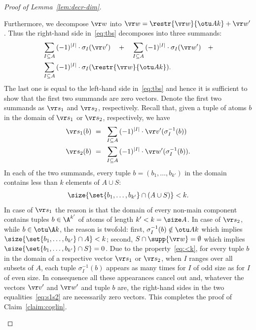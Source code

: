 \begin{proof}[Proof of Lemma~\ref{lem:decr-dim}]
\begin{claimproof}
Furthermore, we decompose $\vr w$ into $\vr w = \restr{\vr w} {\otu A k} + \vr w'$.
Thus the right-hand side in~\eqref{eq:tbs}  decomposes into three summands:
\begin{align*}
&\sum_{I\subseteq A}\, (-1)^{|I|} \cdot \sigma_I (\vr v') \quad + \quad
\sum_{I\subseteq A}\, (-1)^{|I|} \cdot \sigma_I (\vr w') \quad + \\
&\sum_{I\subseteq A}\, (-1)^{|I|} \cdot \sigma_I (\restr{\vr w} {\otu A k}).
\end{align*}
The last one is equal to the left-hand side in~\eqref{eq:tbs} and hence it is sufficient to show that the first two summands are zero vectors.
Denote the first two summands as $\vr s_1$ and $\vr s_2$, respectively.
Recall that, given a tuple of atoms $b$ in the domain of $\vr s_1$ or $\vr s_2$, respectively, we have
\begin{align} \label{eq:s1s2}
\begin{aligned}
\vr s_1(b)\  = \ \ & \sum_{I\subseteq A}\, (-1)^{|I|} \cdot \vr v'(\sigma_I^{-1}(b)) \\
\vr s_2(b) \ = \ \ & \sum_{I\subseteq A}\, (-1)^{|I|} \cdot \vr w'(\sigma_I^{-1}(b)).
\end{aligned}
\end{align}
In each of the two summands, every tuple $b=(b_1, \ldots, b_{k'})$ in the domain contains less than $k$ elements of $A\cup S$:
\begin{align} \label{eq:<k}
\size{\set{b_1, \ldots, b_{k'}} \cap (A\cup S)} < k.
\end{align}
In case of $\vr s_1$ the reason is that the domain of every non-main component contains tuples $b \in \A^{k'}$ of atoms
of length $k' < k = \size A$.
In case of $\vr s_2$, while $b\in\otu \A k$, the reason is twofold: first, $\sigma_I^{-1}(b)\notin  \otu A k$
which implies $\size{\set{b_1, \ldots, b_{k'}} \cap A} < k$; second,
$S\cap \supp{\vr w} = \emptyset$ which implies $\size{\set{b_1, \ldots, b_{k'}} \cap S} = 0$.
Due to the property~\eqref{eq:<k}, 
for every tuple $b$ in the domain of a respective vector $\vr s_1$ or $\vr s_2$,
when $I$ ranges over all subsets of $A$, each tuple $\sigma_I^{-1}(b)$ appears as many times
for $I$ of odd size as for $I$ of even size. In consequence all these appearances cancel out and,
whatever the vectors $\vr v'$ and $\vr w'$ and tuple $b$ are, the right-hand sides in the two equalities~\eqref{eq:s1s2} are necessarily zero vectors.
This completes the proof of Claim~\ref{claim:coglin}.
%

\end{claimproof}
\end{proof}
